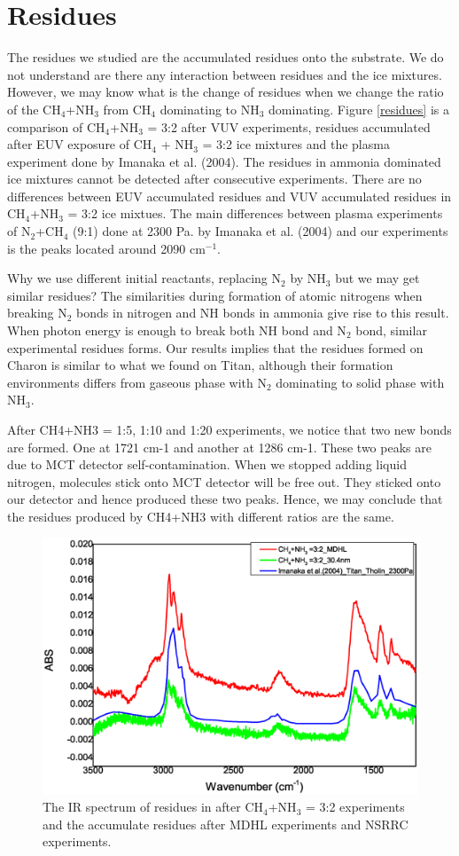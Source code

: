 \section{Residues}
The residues we studied are the accumulated residues onto the substrate. We do not understand are there any interaction between residues and the ice mixtures. However, we may know what is the change of residues when we change the ratio of the CH$_4$+NH$_3$ from CH$_4$ dominating to NH$_3$ dominating.  Figure \ref{residues} is a comparison of CH$_4$+NH$_3$ = 3:2 after VUV experiments, residues accumulated after EUV exposure of CH$_4$ + NH$_3$ = 3:2 ice mixtures and the plasma experiment done by Imanaka et al. (2004). The residues in ammonia dominated ice mixtures cannot be detected after consecutive experiments. There are no differences between EUV accumulated residues and VUV accumulated residues in CH$_4$+NH$_3$ = 3:2 ice mixtues. The main differences between plasma experiments of N$_2$+CH$_4$ (9:1) done at 2300 Pa. by Imanaka et al. (2004) and our experiments is the peaks located around 2090 cm$^{-1}$.

Why we use different initial reactants, replacing N$_2$ by NH$_3$ but we may get similar residues? The similarities during formation of atomic nitrogens when breaking N$_2$ bonds in nitrogen and NH bonds in ammonia give rise to this result. When photon energy is enough to break both NH bond and N$_2$ bond, similar experimental residues forms. Our results implies that the residues formed on Charon is similar to what we found on Titan, although their formation environments differs from gaseous phase with N$_2$ dominating to solid phase with NH$_3$.

After CH4+NH3 = 1:5, 1:10 and 1:20 experiments, we notice that two new bonds are formed. One at 1721 cm-1 and another at 1286 cm-1. These two peaks are due to MCT detector self-contamination. When we stopped adding liquid nitrogen, molecules stick onto MCT detector will be free out. They sticked onto our detector and hence produced these two peaks. Hence, we may conclude that the residues produced by CH4+NH3 with different ratios are the same.

\begin{figure}
\centering
\includegraphics[width=\textwidth]{figures/chapter3/residue.eps}
\caption{The IR spectrum of residues in after CH$_4$+NH$_3$ = 3:2 experiments and the accumulate residues after MDHL experiments and NSRRC experiments.}
\label{fig:residues}
\end{figure}

